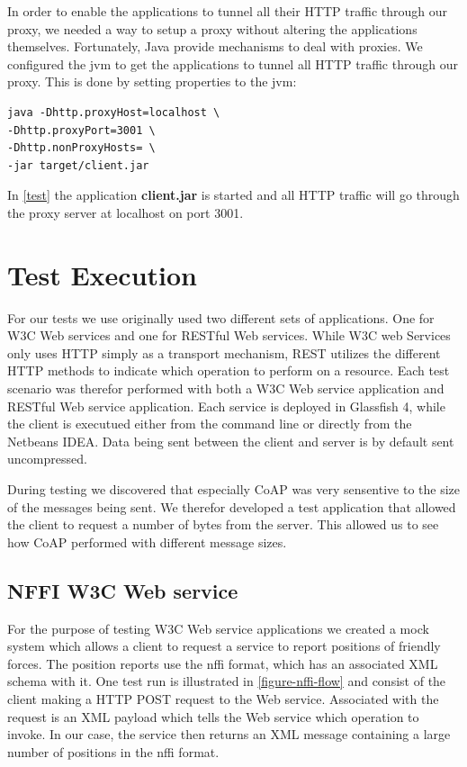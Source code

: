 In order to enable the applications to tunnel all their HTTP traffic through our
proxy, we needed a way to setup a proxy without altering the applications
themselves. Fortunately, Java provide mechanisms to deal with
proxies\cite{oracle-proxy}. We configured the \gls{jvm} to get the applications
to tunnel all HTTP traffic through our proxy. This is done by setting properties
to the \gls{jvm}:


\begin{lstlisting}[frame=single, caption="Setting a proxy on the \gls{jvm}", label=test]
java -Dhttp.proxyHost=localhost \
-Dhttp.proxyPort=3001 \
-Dhttp.nonProxyHosts= \
-jar target/client.jar
\end{lstlisting}

In \cref{test} the application \textbf{client.jar} is started and all HTTP
traffic will go through the proxy server at localhost on port 3001.

\section{Test Execution}

For our tests we use originally used two different sets of applications. One for
W3C Web services and one for RESTful  Web services. While W3C web Services only
uses HTTP simply as a transport mechanism, REST utilizes the different HTTP
methods to indicate which operation to perform on a resource. Each test scenario
was therefor performed with both a W3C Web service application and RESTful Web
service application. Each service is deployed in Glassfish 4, while the client
is executued either from the command line or directly from the Netbeans IDEA.
Data being sent between the client and server is by default sent uncompressed.

During testing we discovered that especially CoAP was very sensentive to the
size of the messages being sent. We therefor developed a test application that
allowed the client to request a number of bytes from the server. This allowed us
to see how CoAP performed with different message sizes.

\subsection{NFFI W3C Web service}

For the purpose of testing W3C Web service applications we created a mock system
which allows a client to request a service to report positions of friendly
forces. The position reports use the \gls{nffi} format, which has an associated
XML schema with it. One test run is illustrated in \cref{figure-nffi-flow} and
consist of the client making a HTTP POST request to the Web service. Associated
with the request is an XML payload which tells the Web service which operation
to invoke. In our case, the service then returns an XML message containing a
large number of positions in the nffi format.

